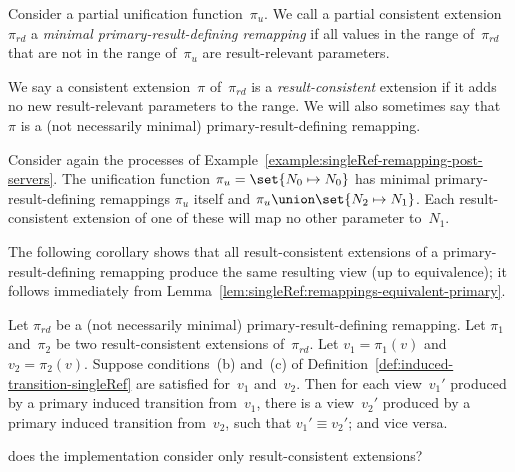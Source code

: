 \begin{definition}
Consider a partial unification function~$\pi_u$.  We call a partial consistent
extension~$\pi_{rd}$ a \emph{minimal primary-result-defining remapping} if all
values in the range of~$\pi_{rd}$ that are not in the range of~$\pi_u$ are
result-relevant parameters.

We say a consistent extension~$\pi$ of~$\pi_{rd}$ is a
\emph{result-consistent} extension if it adds no new result-relevant
parameters to the range.  We will also sometimes say that $\pi$ is a (not
necessarily minimal) primary-result-defining remapping.
\end{definition}


\begin{example}
Consider again the processes of
Example~\ref{example:singleRef-remapping-post-servers}.  The unification
function $\pi_u = \set{N_0 \mapsto N_0}$ has minimal primary-result-defining
remappings $\pi_u$ itself and $\pi_u \union \set{N_2 \mapsto N_1}$.  Each
result-consistent extension of one of these will map no other parameter
to~$N_1$. 
\end{example}



The following corollary shows that all result-consistent extensions of a
primary-result-defining remapping produce the same resulting view (up to
equivalence); it follows immediately from
Lemma~\ref{lem:singleRef:remappings-equivalent-primary}.
%
\begin{corollary}
Let $\pi_{rd}$ be a (not necessarily minimal) primary-result-defining
remapping.  Let $\pi_1$ and~$\pi_2$ be two result-consistent extensions
of~$\pi_{rd}$.  Let $v_1 = \pi_1(v)$ and $v_2 = \pi_2(v)$.  Suppose
conditions~(b) and~(c) of Definition~\ref{def:induced-transition-singleRef}
are satisfied for~$v_1$ and~$v_2$.  Then for each view~$v_1'$ produced by a
primary induced transition from~$v_1$, there is a view~$v_2'$ produced by a
primary induced transition from~$v_2$, such that $v_1' \equiv v_2'$; and vice
versa.
\end{corollary}

\framebox{***} does the implementation consider only result-consistent
extensions? 

